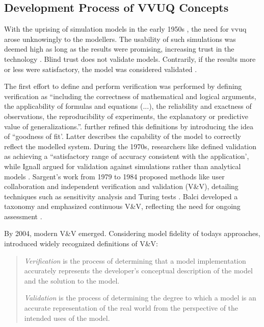 \subsection{Development Process of VVUQ Concepts}
\label{sec:historical-development}
With the uprising of simulation models in the early 1950s \autocite{evans1967simulation}, the need for \gls{vvuq} arose unknowingly to the modellers. The usability of such simulations was deemed high as long as the results were promising, increasing trust in the technology \autocite{durst2017historical}. Blind trust does not validate models. Contrarily, if the results more or less were satisfactory, the model was considered validated \autocite{bonani2003physics}.

The first effort to define and perform verification was performed by \textcite{machlup1955problem} defining verification as ``including the correctness of mathematical and logical arguments, the applicability of formulas and equations (...), the reliability and exactness of observations, the reproducibility of experiments, the explanatory or predictive value of generalizations.''. \Textcite{naylor1967verification} further refined this definitions by introducing the idea of ``goodness of fit'. Latter describes the capability of the model to correctly reflect the modelled system. During the 1970s, researchers like \autocite{schlesinger1979terminology} defined validation as achieving a ``satisfactory range of accuracy consistent with the application', while Ignall argued for validation against simulations rather than analytical models \autocite{ignall1978using}. Sargent's work from 1979 to 1984 proposed methods like user collaboration and independent verification and validation (V\&V), detailing techniques such as sensitivity analysis and Turing tests \autocite{Sargent2010wsc}. Balci developed a taxonomy and emphasized continuous V\&V, reflecting the need for ongoing assessment \autocite{balci2012life}.

By 2004, modern V\&V emerged. Considering model fidelity of todays approaches, \textcite{Oberkampf2004amr} introduced widely recognized definitions of V\&V:

\begin{quote}
  \textit{Verification} is the process of determining that a model implementation accurately represents the developer's conceptual description of the model and the solution to the model.

  \textit{Validation} is the process of determining the degree to which a model is an accurate representation of the real world from the perspective of the intended uses of the model. \autocite{Oberkampf2004amr}
\end{quote}

